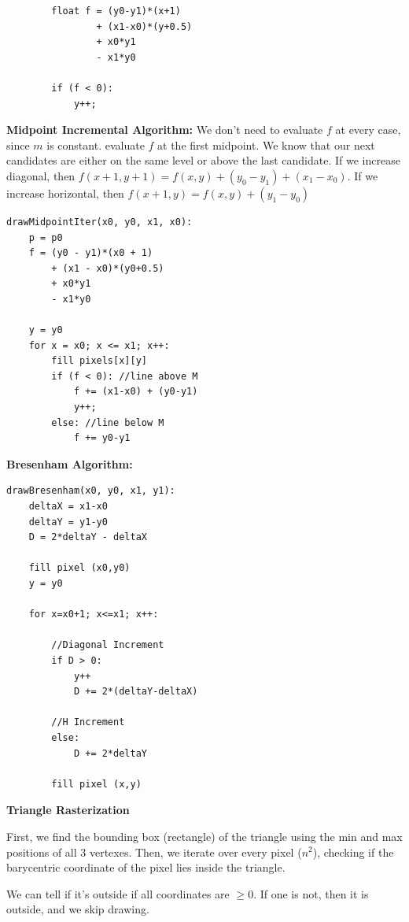 \documentclass[letterpaper, 8pt]{extarticle}
\begin{document}
\begin{multicols*}{4}
\begin{lstlisting}
        float f = (y0-y1)*(x+1) 
                + (x1-x0)*(y+0.5) 
                + x0*y1 
                - x1*y0

        if (f < 0): 
            y++;
\end{lstlisting}


\textbf{Midpoint Incremental Algorithm:} We don't need to evaluate $f$ at every case, since $m$ is constant.
evaluate $f$ at the first midpoint. We know that our next candidates are either on the same level or above the last candidate.
If we increase diagonal, then $f(x+1, y+1) = f(x,y) + (y_0 - y_1) + (x_1 - x_0)$. If we increase horizontal, then $f(x+1, y) = f(x, y) + (y_1 - y_0)$

\begin{lstlisting}
drawMidpointIter(x0, y0, x1, x0):
    p = p0
    f = (y0 - y1)*(x0 + 1) 
        + (x1 - x0)*(y0+0.5) 
        + x0*y1
        - x1*y0

    y = y0
    for x = x0; x <= x1; x++:
        fill pixels[x][y]
        if (f < 0): //line above M
            f += (x1-x0) + (y0-y1) 
            y++;
        else: //line below M
            f += y0-y1
\end{lstlisting}

\textbf{Bresenham Algorithm:} 

\begin{lstlisting} 
drawBresenham(x0, y0, x1, y1):
    deltaX = x1-x0
    deltaY = y1-y0
    D = 2*deltaY - deltaX

    fill pixel (x0,y0)
    y = y0

    for x=x0+1; x<=x1; x++:

        //Diagonal Increment
        if D > 0:
            y++
            D += 2*(deltaY-deltaX)

        //H Increment
        else:
            D += 2*deltaY
        
        fill pixel (x,y)
\end{lstlisting}

\textbf{Triangle Rasterization}

First, we find the bounding box (rectangle) of the triangle using the min and max positions of all 3 vertexes.
Then, we iterate over every pixel ($n^2$), checking if the barycentric coordinate of the pixel lies inside the triangle.

We can tell if it's outside if all coordinates are $\geq 0$. If one is not, then it is outside, and we skip drawing.


\end{multicols*}
\end{document}
